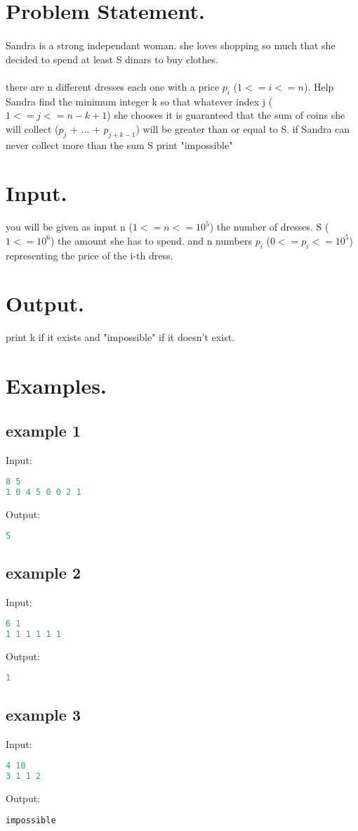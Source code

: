 \documentclass[8pt]{article}
\begin{document}
\section{Problem Statement.}
\paragraph{}
Sandra is a strong independant woman. she loves shopping so much that she decided to spend at least S dinars to buy clothes.
\paragraph{}
there are n different dresses each one with a price $p_i$ ($1<=i<=n$).
Help Sandra find the minimum integer k so that whatever index j ($1<=j<=n-k+1$) she chooses it is guaranteed 
that the sum of coins she will collect ($p_j$ + ... + $p_{j+k-1}$) will be greater than or equal to S.
if Sandra can never collect more than the sum S print "impossible"
\section{Input.}
you will be given as input n ($1<=n<=10^5$) the number of dresses. S ($1<=10^6$) the amount she has to spend.
and n numbers $p_i$ ($0<=p_i<=10^5$) representing the price of the i-th dress.
\section{Output.}
print k if it exists and "impossible" if it doesn't exist.

\section{Examples.}
\subsection{example 1}
Input:
\begin{lstlisting}[language=Python]
8 5
1 0 4 5 0 0 2 1
\end{lstlisting}
Output:
\begin{lstlisting}[language=Python]
5
\end{lstlisting}
\subsection{example 2}
Input:
\begin{lstlisting}[language=Python]
6 1
1 1 1 1 1 1
\end{lstlisting}
Output:
\begin{lstlisting}[language=Python]
1
\end{lstlisting}
\subsection{example 3}
Input:
\begin{lstlisting}[language=Python]
4 10
3 1 1 2
\end{lstlisting}
Output:
\begin{lstlisting}[language=Python]
impossible
\end{lstlisting}
\end{document}
